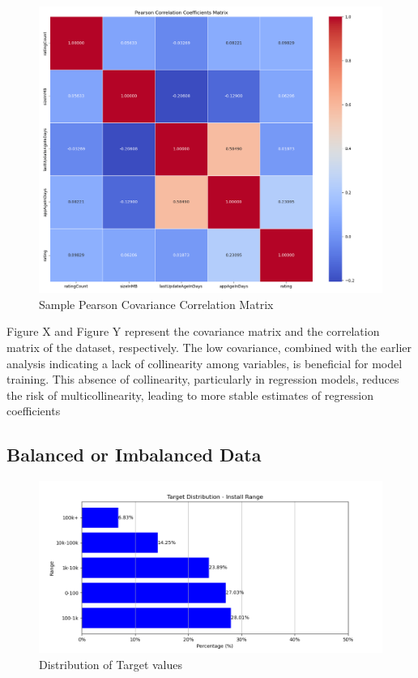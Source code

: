 \begin{figure}[h]
\centering
\includegraphics[width=\textwidth]{docs//assets/cor.png}
\caption{Sample Pearson Covariance Correlation Matrix}
\end{figure}

Figure X and Figure Y represent the covariance matrix and the correlation matrix of the dataset, respectively. The low covariance, combined with the earlier analysis indicating a lack of collinearity among variables, is beneficial for model training. This absence of collinearity, particularly in regression models, reduces the risk of multicollinearity, leading to more stable estimates of regression coefficients

\subsection{Balanced or Imbalanced Data}

\begin{figure}[h]
\centering
\includegraphics[width=\textwidth]{docs//assets/target.png}
\caption{Distribution of Target values}
\end{figure}


